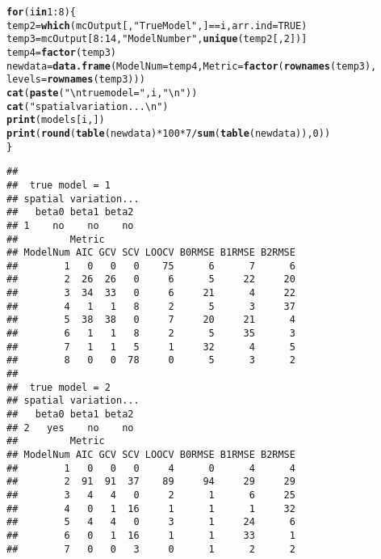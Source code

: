 \documentclass{article}\usepackage[]{graphicx}\usepackage[]{color}
\makeatletter
\newcommand{\hlnum}[1]{\textcolor[rgb]{0.686,0.059,0.569}{#1}}%
\newcommand{\hlstr}[1]{\textcolor[rgb]{0.192,0.494,0.8}{#1}}%
\newcommand{\hlopt}[1]{\textcolor[rgb]{0,0,0}{#1}}%
\newcommand{\hlstd}[1]{\textcolor[rgb]{0.345,0.345,0.345}{#1}}%
\newcommand{\hlkwa}[1]{\textcolor[rgb]{0.161,0.373,0.58}{\textbf{#1}}}%
\newcommand{\hlkwb}[1]{\textcolor[rgb]{0.69,0.353,0.396}{#1}}%
\newcommand{\hlkwc}[1]{\textcolor[rgb]{0.333,0.667,0.333}{#1}}%
\newcommand{\hlkwd}[1]{\textcolor[rgb]{0.737,0.353,0.396}{\textbf{#1}}}%
\newenvironment{kframe}{%
 \def\at@end@of@kframe{}%
 \ifinner\ifhmode%
  \def\at@end@of@kframe{\end{minipage}}%
  \begin{minipage}{\columnwidth}%
 \fi\fi%
 \def\FrameCommand##1{\hskip\@totalleftmargin \hskip-\fboxsep
 \colorbox{shadecolor}{##1}\hskip-\fboxsep
     \hskip-\linewidth \hskip-\@totalleftmargin \hskip\columnwidth}%
 \MakeFramed {\advance\hsize-\width
   \@totalleftmargin\z@ \linewidth\hsize
   \@setminipage}}%
 {\par\unskip\endMakeFramed%
 \at@end@of@kframe}
\newenvironment{knitrout}{}{} %
\makeatother
\begin{document}
\begin{knitrout}
\color{fgcolor}\begin{kframe}
\begin{alltt}
\hlkwa{for} \hlstd{(i} \hlkwa{in} \hlnum{1}\hlopt{:}\hlnum{8}\hlstd{) \{}
    \hlstd{temp2} \hlkwb{=} \hlkwd{which}\hlstd{(mcOutput[,} \hlstr{"True Model"}\hlstd{, ]} \hlopt{==} \hlstd{i,} \hlkwc{arr.ind} \hlstd{=} \hlnum{TRUE}\hlstd{)}
    \hlstd{temp3} \hlkwb{=} \hlstd{mcOutput[}\hlnum{8}\hlopt{:}\hlnum{14}\hlstd{,} \hlstr{"Model Number"}\hlstd{,} \hlkwd{unique}\hlstd{(temp2[,} \hlnum{2}\hlstd{])]}
    \hlstd{temp4} \hlkwb{=} \hlkwd{factor}\hlstd{(temp3)}
    \hlstd{newdata} \hlkwb{=} \hlkwd{data.frame}\hlstd{(}\hlkwc{ModelNum} \hlstd{= temp4,} \hlkwc{Metric} \hlstd{=} \hlkwd{factor}\hlstd{(}\hlkwd{rownames}\hlstd{(temp3),}
        \hlkwc{levels} \hlstd{=} \hlkwd{rownames}\hlstd{(temp3)))}
    \hlkwd{cat}\hlstd{(}\hlkwd{paste}\hlstd{(}\hlstr{"\textbackslash{}n true model ="}\hlstd{, i,} \hlstr{"\textbackslash{}n"}\hlstd{))}
    \hlkwd{cat}\hlstd{(}\hlstr{"spatial variation...\textbackslash{}n"}\hlstd{)}
    \hlkwd{print}\hlstd{(models[i, ])}
    \hlkwd{print}\hlstd{(}\hlkwd{round}\hlstd{(}\hlkwd{table}\hlstd{(newdata)} \hlopt{*} \hlnum{100} \hlopt{*} \hlnum{7}\hlopt{/}\hlkwd{sum}\hlstd{(}\hlkwd{table}\hlstd{(newdata)),} \hlnum{0}\hlstd{))}
\hlstd{\}}
\end{alltt}
\begin{verbatim}
## 
##  true model = 1 
## spatial variation...
##   beta0 beta1 beta2
## 1    no    no    no
##         Metric
## ModelNum AIC GCV SCV LOOCV B0RMSE B1RMSE B2RMSE
##        1   0   0   0    75      6      7      6
##        2  26  26   0     6      5     22     20
##        3  34  33   0     6     21      4     22
##        4   1   1   8     2      5      3     37
##        5  38  38   0     7     20     21      4
##        6   1   1   8     2      5     35      3
##        7   1   1   5     1     32      4      5
##        8   0   0  78     0      5      3      2
## 
##  true model = 2 
## spatial variation...
##   beta0 beta1 beta2
## 2   yes    no    no
##         Metric
## ModelNum AIC GCV SCV LOOCV B0RMSE B1RMSE B2RMSE
##        1   0   0   0     4      0      4      4
##        2  91  91  37    89     94     29     29
##        3   4   4   0     2      1      6     25
##        4   0   1  16     1      1      1     32
##        5   4   4   0     3      1     24      6
##        6   0   1  16     1      1     33      1
##        7   0   0   3     0      1      2      2

\end{verbatim}
\end{kframe}
\end{knitrout}
\end{document}
